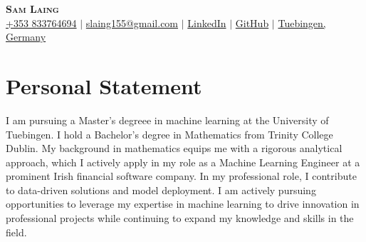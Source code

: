 \documentclass[letterpaper,10pt]{article}
\begin{document}

\begin{center}
    \textbf{\Huge \scshape Sam Laing} \\ \vspace{3pt}
    \small
    \faMobile \hspace{.5pt} \href{tel:353833764694}{+353 833764694}
    $|$
    \faAt \hspace{.5pt} \href{slaing155@gmail.com}{slaing155@gmail.com}
    $|$
    \faLinkedinSquare \hspace{.5pt} \href{https://www.linkedin.com/in/sam-laing-196403214}{LinkedIn}
    $|$
    \faGithub \hspace{.5pt} \href{https://github.com/sam-laing}{GitHub}
    $|$
    \faMapMarker \hspace{.5pt} \href{https://maps.app.goo.gl/zDdAp6SFpdj8fM548}{Tuebingen, Germany}
\end{center}

\section{Personal Statement}
I am pursuing a Master's degreee in machine learning at the University of Tuebingen. I hold a Bachelor's degree in Mathematics from Trinity College Dublin. My background in mathematics equips me with a rigorous analytical approach, which I actively apply in my role as a Machine Learning Engineer at a prominent Irish financial software company. In my professional role, I contribute to data-driven solutions and model deployment. I  am actively pursuing opportunities to leverage my expertise in machine learning to drive innovation in professional projects while continuing to expand my knowledge and skills in the field.

\end{document}
